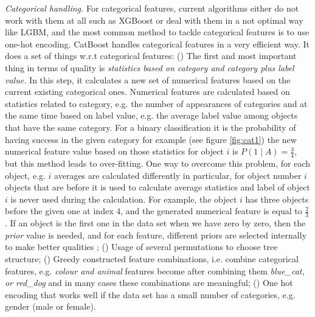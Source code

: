 \textit{Categorical handling.} For categorical features, current algorithms either do not work with them at all such as XGBoost or deal with them in a not optimal way like LGBM, and the most common method to tackle categorical features is to use one-hot encoding. CatBoost handles categorical features in a very efficient way. It does a set of things w.r.t categorical features: () The first and most important thing in terms of quality is \textit{statistics based on category and category plus label value.} In this step, it calculates a new set of numerical features based on the current existing categorical ones. Numerical features are calculated based on statistics related to category, e.g. the number of appearances of categories and at the same time based on label value, e.g. the average label value among objects that have the same category. For a binary classification it is the probability of having success in the given category for example (see figure \ref{fig:cat1}) the new numerical feature value based on those statistics for object $i$ is $P(1 \mid A) = \frac{3}{4}$, but this method leads to over-fitting. One way to overcome this problem, for each object, e.g. $i$ averages are calculated differently in particular, for object number $i$ objects that are before it is used to calculate average statistics and label of object $i$ is never used during the calculation. For example, the object $i$ has three objects before the given one at index $4$, and the generated numerical feature is equal to $\frac{2}{3}$.  If an object is the first one in the data set when we have zero by zero, then the \textit{prior} value is needed, and for each feature, different priors are selected internally to make better qualities \cite{prokhorenkova2018catboost}; () Usage of several permutations to choose tree structure; () Greedy constructed feature combinations, i.e. combine categorical features, e.g. \textit{colour and animal} features become after combining them \textit{blue\_cat, or red\_dog} and in many cases these combinations are meaningful; () One hot encoding that works well if the data set has a small number of categories, e.g. gender (male or female).

